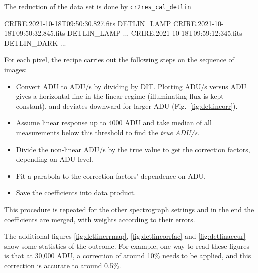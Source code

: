 The reduction of the data set is done by \verb!cr2res_cal_detlin!
\begin{shell}[fontsize=\footnotesize]
    CRIRE.2021-10-18T09:50:30.827.fits DETLIN_LAMP
    CRIRE.2021-10-18T09:50:32.845.fits DETLIN_LAMP
    ...
    CRIRE.2021-10-18T09:59:12:345.fits DETLIN_DARK
    ...

\end{shell}

For each pixel, the recipe carries out the following steps on the sequence of images:
\begin{itemize}
    \item Convert ADU to ADU/s by dividing by DIT. Plotting ADU/s versus ADU
    gives a horizontal line in the linear regime (illuminating flux is kept
    constant), and deviates downward for larger ADU (Fig.~\ref{fig:detlincorr}).
    \item Assume linear response up to 4000 ADU and take median of all
    measurements below this threshold to find the \emph{true ADU/s}.
    \item Divide the non-linear ADU/s by the true value to get the correction
    factors, depending on ADU-level.
    \item Fit a parabola to the correction factors' dependence on ADU.
    \item Save the coefficients into data product.
\end{itemize}

This procedure is repeated for the other spectrograph settings and in the end
the coefficients are merged, with weights according to their errors.







The additional figures \ref{fig:detlinerrmap}, \ref{fig:detlincorrfac} and \ref{fig:detlinaccur} show some statistics of the outcome.
For example, one way to read these figures is that at 30,000 ADU, a correction
of around 10\% needs to be applied, and this correction is accurate to around
0.5\%. 
